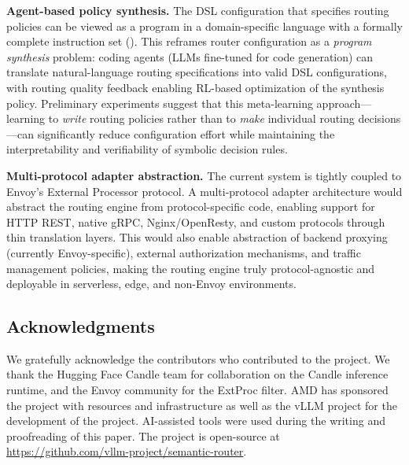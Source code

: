 \noindent\textbf{Agent-based policy synthesis.}
The DSL configuration that specifies routing policies can be viewed as a program in a domain-specific language with a formally complete instruction set ().
This reframes router configuration as a \emph{program synthesis} problem: coding agents (LLMs fine-tuned for code generation) can translate natural-language routing specifications into valid DSL configurations, with routing quality feedback enabling RL-based optimization of the synthesis policy.
Preliminary experiments suggest that this meta-learning approach---learning to \emph{write} routing policies rather than to \emph{make} individual routing decisions---can significantly reduce configuration effort while maintaining the interpretability and verifiability of symbolic decision rules.

\noindent\textbf{Multi-protocol adapter abstraction.}
The current system is tightly coupled to Envoy's External Processor protocol. A multi-protocol adapter architecture would abstract the routing engine from protocol-specific code, enabling support for HTTP REST, native gRPC, Nginx/OpenResty, and custom protocols through thin translation layers.
This would also enable abstraction of backend proxying (currently Envoy-specific), external authorization mechanisms, and traffic management policies, making the routing engine truly protocol-agnostic and deployable in serverless, edge, and non-Envoy environments.

\subsection*{Acknowledgments}

We gratefully acknowledge the contributors who contributed to the project.
We thank the Hugging Face Candle team for collaboration on the Candle inference runtime, and the Envoy community for the ExtProc filter.
AMD has sponsored the project with resources and infrastructure as well as the vLLM project for the development of the project.
AI-assisted tools were used during the writing and proofreading of this paper.
The project is open-source at \url{https://github.com/vllm-project/semantic-router}.
